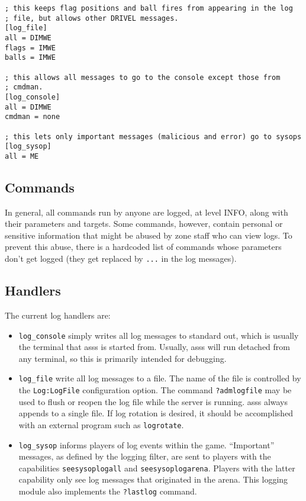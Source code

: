\documentclass{article}
\newcommand{\asss}{asss}
\begin{document}
\begin{verbatim}
; this keeps flag positions and ball fires from appearing in the log
; file, but allows other DRIVEL messages.
[log_file]
all = DIMWE
flags = IMWE
balls = IMWE

; this allows all messages to go to the console except those from
; cmdman.
[log_console]
all = DIMWE
cmdman = none

; this lets only important messages (malicious and error) go to sysops
[log_sysop]
all = ME
\end{verbatim}


\subsection{Commands}

In general, all commands run by anyone are logged, at level INFO, along
with their parameters and targets. Some commands, however, contain
personal or sensitive information that might be abused by zone staff who
can view logs. To prevent this abuse, there is a hardcoded list of
commands whose parameters don't get logged (they get replaced by
\verb/.../ in the log messages).


\subsection{Handlers}

The current log handlers are:

\begin{itemize}

\item{\verb/log_console/} simply writes all log messages to standard
out, which is usually the terminal that \asss{} is started from.
Usually, \asss{} will run detached from any terminal, so this is
primarily intended for debugging.

\item{\verb/log_file/} write all log messages to a file. The name of the
file is controlled by the \verb/Log:LogFile/ configuration option. The
command \verb/?admlogfile/ may be used to flush or reopen the log file
while the server is running. \asss{} always appends to a single file. If
log rotation is desired, it should be accomplished with an external
program such as \verb/logrotate/.

\item{\verb/log_sysop/} informs players of log events within the game.
``Important'' messages, as defined by the logging filter, are sent to
players with the capabilities \verb/seesysoplogall/ and
\verb/seesysoplogarena/. Players with the latter capability only see log
messages that originated in the arena. This logging module also
implements the \verb/?lastlog/ command.

\end{itemize}
\end{document}

